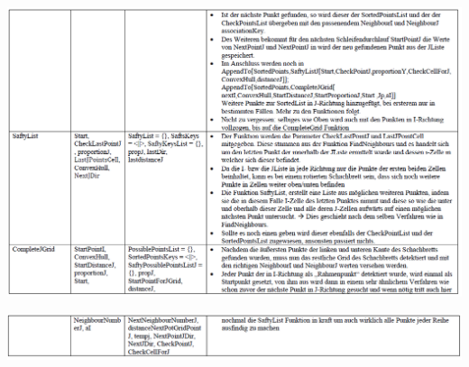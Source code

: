 \begin{minipage}{\linewidth}
	\centering
	\includegraphics[width=1\linewidth]{images/KD4.png}
\end{minipage}
\begin{minipage}{\linewidth}
	\centering
	\includegraphics[width=1\linewidth]{images/KD5.png}
\end{minipage}\\







